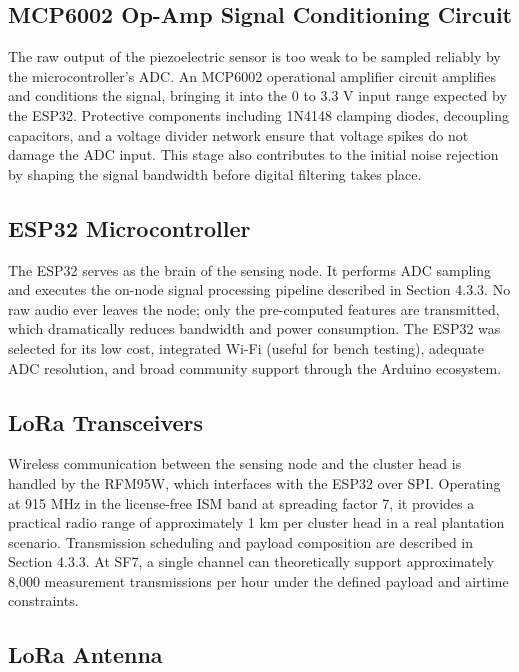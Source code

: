 \documentclass[12pt,a4paper,oneside]{memoir}
\begin{document}
\subsection{MCP6002 Op-Amp Signal Conditioning Circuit}

The raw output of the piezoelectric sensor is too weak to be sampled reliably by the microcontroller's ADC. An MCP6002 operational amplifier circuit amplifies and conditions the signal, bringing it into the 0 to 3.3 V input range expected by the ESP32. Protective components including 1N4148 clamping diodes, decoupling capacitors, and a voltage divider network ensure that voltage spikes do not damage the ADC input. This stage also contributes to the initial noise rejection by shaping the signal bandwidth before digital filtering takes place.

\subsection{ESP32 Microcontroller}

The ESP32 serves as the brain of the sensing node. It performs ADC sampling and executes the on-node signal processing pipeline described in Section 4.3.3. No raw audio ever leaves the node; only the pre-computed features are transmitted, which dramatically reduces bandwidth and power consumption. The ESP32 was selected for its low cost, integrated Wi-Fi (useful for bench testing), adequate ADC resolution, and broad community support through the Arduino ecosystem.

\subsection{LoRa Transceivers}

Wireless communication between the sensing node and the cluster head is handled by the RFM95W, which interfaces with the ESP32 over SPI. Operating at 915 MHz in the license-free ISM band at spreading factor 7, it provides a practical radio range of approximately 1 km per cluster head in a real plantation scenario. Transmission scheduling and payload composition are described in Section 4.3.3. At SF7, a single channel can theoretically support approximately 8,000 measurement transmissions per hour under the defined payload and airtime constraints.

\subsection{LoRa Antenna}
\end{document}
